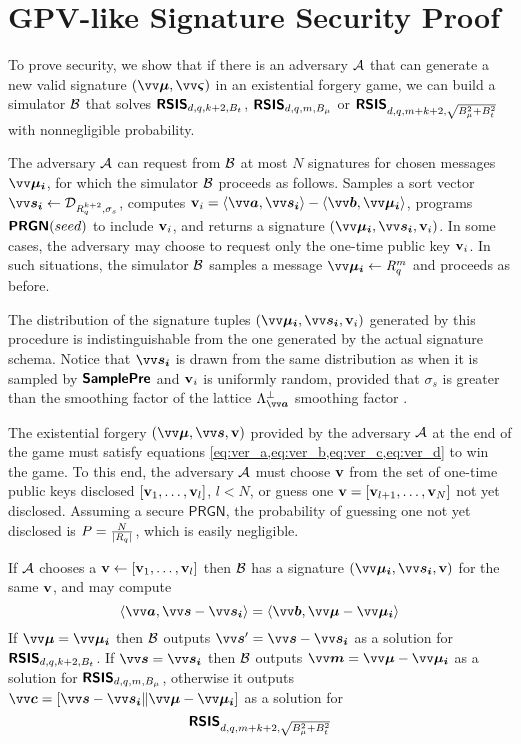 \section{GPV-like Signature Security Proof}\label{app:sigproof}
To prove security, we show that if there is an adversary $\mathcal{A}$ that can generate a new valid signature $(\pv{\mu},\pv{\varsigma})$ in an existential forgery game, we can build a simulator $\mathcal{B}$ that solves $\textsf{\textbf{RSIS}}_{d,q,k+2,B_t}$, $\textsf{\textbf{RSIS}}_{d,q,m,B_{\mu}}$ or $\textsf{\textbf{RSIS}}_{d,q,m+k+2,\sqrt{B_{\mu}^2+B_t^2}}$ with nonnegligible probability.

The adversary $\mathcal{A}$ can request from $\mathcal{B}$ at most $N$ signatures for chosen messages $\pv{\mu_i}$, for which the simulator $\mathcal{B}$ proceeds as follows. Samples a sort vector $\pv{s_i} \from \D_{\intring_q^{k+2},\sigma_s}$, computes $\pvv_i=\inprod{\pv{a}}{\pv{s_i}}-\inprod{\pv{b}}{\pv{\mu_i}}$, programs $\textsf{\textbf{PRGN}}(seed)$ to include $\mathbf{v}_i$, and returns a signature $(\pv{\mu_i},\pv{s_i},\pvv_i)$. In some cases, the adversary may choose to request only the one-time public key $\mathbf{v}_i$. In such situations, the simulator $\mathcal{B}$ samples a message $\pv{\mu_i} \from \intring_q^m$ and proceeds as before.

The distribution of the signature tuples $(\pv{\mu_i},\pv{s_i},\pvv_i)$ generated by this procedure is indistinguishable from the one generated by the actual signature schema. Notice that $\pv{s_i}$ is drawn from the same distribution as when it is sampled by $\textsf{\textbf{SamplePre}}$ and $\mathbf{v}_i$ is uniformly random, provided that $\sigma_s$ is greater than the smoothing factor of the lattice $\Lambda_{\pv{a}}^{\bot}$ smoothing factor \cite{micciancioWorstcaseAveragecaseReductions2007}.

The existential forgery $(\pv{\mu},\pv{s},\pvv)$ provided by the adversary $\mathcal{A}$ at the end of the game must satisfy equations \cref{eq:ver_a,eq:ver_b,eq:ver_c,eq:ver_d} to win the game. To this end, the adversary $\mathcal{A}$ must choose $\mathbf{v}$ from the set of one-time public keys disclosed $[\mathbf{v}_1,\ldots,\mathbf{v}_l]$, $l<N$, or guess one $\mathbf{v} = [\mathbf{v}_{l+1},\ldots,\mathbf{v}_N]$ not yet disclosed. Assuming a secure $\mathsf{PRGN}$, the probability of guessing one not yet disclosed is $P=\frac{N}{|\mathit{R}_q|}$, which is easily negligible.

If $\mathcal{A}$ chooses a $\mathbf{v} \leftarrow [\mathbf{v}_1,\ldots,\mathbf{v}_l]$ then $\mathcal{B}$ has a signature $(\pv{\mu_i},\pv{s_i},\pvv)$ for the same $\mathbf{v}$, and may compute
\begin{equation}\inprod{\pv{a}}{\pv{s}-\pv{s_i}} = \inprod{\pv{b}}{\pv{\mu}-\pv{\mu_i}}\end{equation}
If $\pv{\mu}=\pv{\mu_i}$ then $\mathcal{B}$ outputs $\pv{s}' = \pv{s}-\pv{s_i}$ as a solution for $\textsf{\textbf{RSIS}}_{d,q,k+2,B_t}$. If $\pv{s}=\pv{s_i}$ then $\mathcal{B}$ outputs $\pv{m} = \pv{\mu}-\pv{\mu_i}$ as a solution for $\textsf{\textbf{RSIS}}_{d,q,m,B_{\mu}}$, otherwise it outputs $\pv{c}=[\pv{s}-\pv{s_i}\|\pv{\mu}-\pv{\mu_i}]$ as a solution for \[\textsf{\textbf{RSIS}}_{d,q,m+k+2,\sqrt{B_{\mu}^2+B_t^2}}\]

